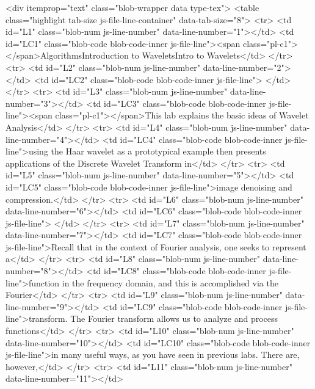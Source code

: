   <div itemprop="text" class="blob-wrapper data type-tex">
      <table class="highlight tab-size js-file-line-container" data-tab-size="8">
      <tr>
        <td id="L1" class="blob-num js-line-number" data-line-number="1"></td>
        <td id="LC1" class="blob-code blob-code-inner js-file-line"><span class="pl-c1">\lab</span>{Algorithms}{Introduction to Wavelets}{Intro to Wavelets}</td>
      </tr>
      <tr>
        <td id="L2" class="blob-num js-line-number" data-line-number="2"></td>
        <td id="LC2" class="blob-code blob-code-inner js-file-line">
</td>
      </tr>
      <tr>
        <td id="L3" class="blob-num js-line-number" data-line-number="3"></td>
        <td id="LC3" class="blob-code blob-code-inner js-file-line"><span class="pl-c1">\objective</span>{This lab explains the basic ideas of Wavelet Analysis</td>
      </tr>
      <tr>
        <td id="L4" class="blob-num js-line-number" data-line-number="4"></td>
        <td id="LC4" class="blob-code blob-code-inner js-file-line">using the Haar wavelet as a prototypical example then presents applications of the Discrete Wavelet Transform in</td>
      </tr>
      <tr>
        <td id="L5" class="blob-num js-line-number" data-line-number="5"></td>
        <td id="LC5" class="blob-code blob-code-inner js-file-line">image denoising and compression.}</td>
      </tr>
      <tr>
        <td id="L6" class="blob-num js-line-number" data-line-number="6"></td>
        <td id="LC6" class="blob-code blob-code-inner js-file-line">
</td>
      </tr>
      <tr>
        <td id="L7" class="blob-num js-line-number" data-line-number="7"></td>
        <td id="LC7" class="blob-code blob-code-inner js-file-line">Recall that in the context of Fourier analysis, one seeks to represent a</td>
      </tr>
      <tr>
        <td id="L8" class="blob-num js-line-number" data-line-number="8"></td>
        <td id="LC8" class="blob-code blob-code-inner js-file-line">function in the frequency domain, and this is accomplished via the Fourier</td>
      </tr>
      <tr>
        <td id="L9" class="blob-num js-line-number" data-line-number="9"></td>
        <td id="LC9" class="blob-code blob-code-inner js-file-line">transform. The Fourier transform allows us to analyze and process functions</td>
      </tr>
      <tr>
        <td id="L10" class="blob-num js-line-number" data-line-number="10"></td>
        <td id="LC10" class="blob-code blob-code-inner js-file-line">in many useful ways, as you have seen in previous labs. There are, however,</td>
      </tr>
      <tr>
        <td id="L11" class="blob-num js-line-number" data-line-number="11"></td>
